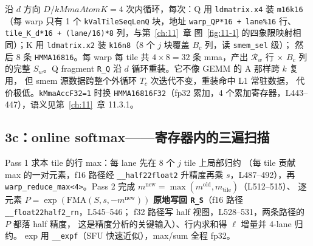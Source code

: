 沿 $d$ 方向 $D/kMmaAtomK = 4$ 次内循环，每次：Q 用
\texttt{ldmatrix.x4} 装 \texttt{m16k16}（每 warp 只有 1 个
\texttt{k\allowbreak{}Val\allowbreak{}Tile\allowbreak{}Seq\allowbreak{}Len\allowbreak{}Q} 块，地址 \texttt{warp\_QP*16 + lane\%16} 行、
\texttt{tile\_K\_d*16 + (lane/16)*8} 列，与第~\ref{ch:11}~章
图~\ref{fig:11-1} 的四象限映射相同）；K 用 \texttt{ldmatrix.x2} 装
\texttt{k16n8}（8 个 $j$ 块覆盖 $B_c$ 列，读 \texttt{smem\_sel} 级）；
然后 8 条 \texttt{HMMA16816}。每 warp 每 tile 共 $4\times 8 = 32$ 条
mma，产出 $\mathcal{R}_w$ 行 $\times$ $B_c$ 列的完整 $S_w$。Q fragment
\texttt{R\_Q} 沿 $d$ 循环重装。它不像 GEMM 的 A 那样跨 $k$ 复用，
但 smem 源数据跨整个外循环 $T_c$ 次迭代不变，重装命中 L1 常驻数据，
代价极低。\texttt{k\allowbreak{}Mma\allowbreak{}Acc\allowbreak{}F32=\allowbreak{}1} 时换 \texttt{HMMA16816\allowbreak{}F32}（fp32
累加，4 个累加寄存器，L443--447），语义见第~\ref{ch:11}~章 11.3.1。

\subsection{3c：online softmax——寄存器内的三遍扫描}









Pass 1 求本 tile 的行 max：每 lane 先在 8 个 $j$ tile 上局部归约
（每 tile 贡献 max 的一对元素，f16 路径经 \texttt{\_\allowbreak{}\_\allowbreak{}half22float2}
升精度再乘 $s$，L487--492），再 \texttt{warp\_\allowbreak{}reduce\_\allowbreak{}max\allowbreak{}<4>}。Pass 2
完成 $m^{\text{new}}=\max(m^{\text{old}}, m_{\text{tile}})$（L512--515）、
逐元素 $P=\exp(\mathrm{FMA}(S, s, -m^{\text{new}}))$ \textbf{原地写回
\texttt{R\_S}}（f16 路径 \texttt{\_\allowbreak{}\_\allowbreak{}float22half2\_\allowbreak{}rn}，L545--546；
f32 路径写 half 视图，L528--531，两条路径的 $P$ 都落 half 精度，
这是精度分析的关键输入）、行内求和得 $\ell$ 增量并 4-lane 归约。
exp 用 \texttt{\_\_expf}（SFU 快速近似），max/sum 全程 fp32。

